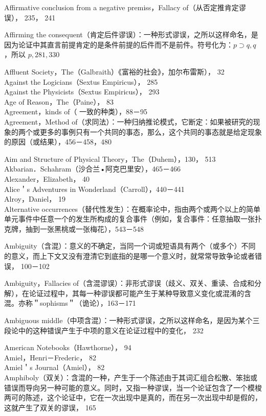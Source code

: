 Affirmative conclusion from a negative premiss，Fallacy of（从否定推肯定谬误）， 235， 241

Affirming the consequent（肯定后件谬误）：一种形式谬误，之所以这样命名，是因为论证中其直言前提肯定的是条件前提的后件而不是前件。符号化为：$p \supset q, q$ ，所以 $p, 281,330$

Affluent Society，The（Galbraith）《富裕的社会》，加尔布雷斯）， 32\\
Against the Logicians（Sextus Empiricus）， 285\\
Against the Physicists（Sextus Empiricus）， 293\\
Age of Reason，The（Paine）， 83\\
Agreement，kinds of（ 一致的种类），88－95\\
Agreement，Method of（求同法）：一种归纳推论模式，它断定：如果被研究的现象的两个或更多的事例只有一个共同的事态，那么，这个共同的事态就是给定现象的原因（或结果），456－458，480

Aim and Structure of Physical Theory，The（Duhem），130， 513\\
Akbarian．Schahram（沙合兰•阿克巴里安），465－466\\
Alexander，Elizabeth， 40\\
Alice＇s Adventures in Wonderland（Carroll），440－441\\
Alroy，Daniel， 19\\
Alternative occurrences（替代性发生）：在概率论中，指由两个或两个以上的简单单元事件中任意一个的发生所构成的复合事件（例如，复合事件：任意抽取一张扑克牌，抽到一张黑桃或一张梅花），543－548

Ambiguity（含混）：意义的不确定，当同一个词或短语具有两个（或多个）不同的意义，而上下文又没有澄清它到底指的是哪一个意义时，就常常导致争论或者错误， 100－102

Ambiguity，Fallacies of（含混谬误）：非形式谬误（歧义、双关、重读、合成和分解），在论证过程中，其每一种谬误都可能产生于某种导致意义变化或混淆的含混。亦称＂sophisms＂（诡论），163－171

Ambiguous middle（中项含混）：一种形式谬误，之所以这样命名，是因为某个三段论中的这种错误产生于中项的意义在论证过程中的变化， 232

American Notebooks（Hawthorne）， 94\\
Amiel，Henri－Frederic， 82\\
Amiel＇s Journal（Amiel）， 82\\
Amphiboly（双关）：含混的一种，产生于一个陈述由于其词汇组合松散、笨拙或错误而导向另一种可能的意义。同时，又指一种谬误，当一个论证包含了一个模梭两可的陈述，这个论证中，它在一次出现中是真的，而在另一次出现中却是假的，这就产生了双关的谬误， 165

